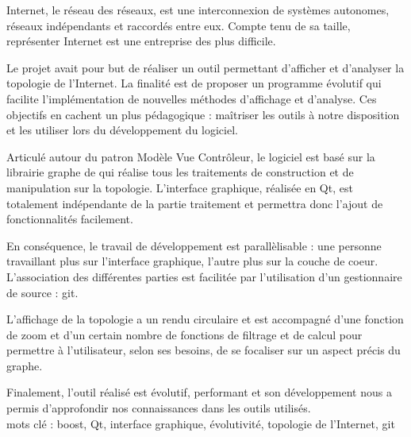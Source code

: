 \par
Internet, le réseau des réseaux, est une interconnexion de systèmes autonomes, réseaux indépendants et raccordés entre eux. Compte tenu de sa taille, représenter Internet est une entreprise des plus difficile.

Le projet avait pour but de réaliser un outil permettant d'afficher et d'analyser la topologie de l'Internet. La finalité est de proposer un programme évolutif qui facilite l'implémentation de nouvelles méthodes d'affichage et d'analyse. Ces objectifs en cachent un plus pédagogique : maîtriser les outils à notre disposition et les utiliser lors du développement du logiciel.

Articulé autour du patron Modèle Vue Contrôleur, le logiciel est basé sur la librairie graphe de \boost qui réalise tous les traitements de construction et de manipulation sur la topologie. L'interface graphique, réalisée en Qt, est totalement indépendante de la partie traitement et permettra donc l'ajout de fonctionnalités facilement.

En cons\'equence, le travail de d\'eveloppement est parall\`elisable : une personne travaillant plus sur l'interface graphique, l'autre plus sur la couche de coeur. L'association des diff\'erentes parties est facilit\'ee par l'utilisation d'un gestionnaire de source : git.

L'affichage de la topologie a un rendu circulaire et est accompagné d'une fonction de zoom et d'un certain nombre de fonctions de filtrage et de calcul pour permettre à l'utilisateur, selon ses besoins, de se focaliser sur un aspect précis du graphe.

Finalement, l'outil r\'ealis\'e est \'evolutif, performant et son d\'eveloppement nous a permis d'approfondir nos connaissances dans les outils utilis\'es.\\

mots cl\'e : boost, Qt, interface graphique, évolutivité, topologie de l'Internet, git







